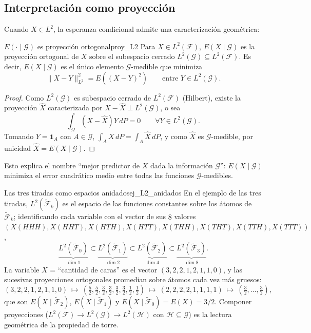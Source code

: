 \documentclass[11pt, a4paper]{article}
\begin{document}
\subsection{Interpretación como proyección}

Cuando $X \in L^2$, la esperanza condicional admite una caracterización geométrica:

\begin{teorema}{$E(\cdot \mid \mathcal{G})$ es proyección ortogonal}{proy_L2}
Para $X \in L^2(\mathcal{F})$, $E(X \mid \mathcal{G})$ es la proyección ortogonal de $X$ sobre el
subespacio cerrado $L^2(\mathcal{G}) \subseteq L^2(\mathcal{F})$. Es decir, $E(X \mid \mathcal{G})$
es el único elemento $\mathcal{G}$-medible que minimiza
$$ \|X - Y\|_{L^2}^2 = E((X - Y)^2) \qquad \text{entre } Y \in L^2(\mathcal{G}). $$
\end{teorema}

\begin{proof}
Como $L^2(\mathcal{G})$ es subespacio cerrado de $L^2(\mathcal{F})$ (Hilbert), existe la
proyección $\widehat{X}$ caracterizada por $X - \widehat{X} \perp L^2(\mathcal{G})$, o sea
$$ \int_\Omega (X - \widehat{X}) Y \, dP = 0 \qquad \forall Y \in L^2(\mathcal{G}). $$
Tomando $Y = \mathbf{1}_A$ con $A \in \mathcal{G}$, $\int_A X \, dP = \int_A \widehat{X} \, dP$, y
como $\widehat{X}$ es $\mathcal{G}$-medible, por unicidad $\widehat{X} = E(X \mid \mathcal{G})$.
\end{proof}

\obs Esto explica el nombre ``mejor predictor de $X$ dada la información $\mathcal{G}$'':
$E(X \mid \mathcal{G})$ minimiza el error cuadrático medio entre todas las funciones
$\mathcal{G}$-medibles.

\begin{ejemplo}{Las tres tiradas como espacios anidados}{ej_L2_anidados}
En el ejemplo de las tres tiradas, $L^2(\widetilde{\mathcal{F}}_k)$ es el espacio de las
funciones constantes sobre los átomos de $\widetilde{\mathcal{F}}_k$; identificando cada
variable con el vector de sus $8$ valores $(X(HHH), X(HHT), X(HTH), X(HTT), X(THH), X(THT),
X(TTH), X(TTT))$,
$$ \underbrace{L^2(\widetilde{\mathcal{F}}_0)}_{\dim 1} \subset
\underbrace{L^2(\widetilde{\mathcal{F}}_1)}_{\dim 2} \subset
\underbrace{L^2(\widetilde{\mathcal{F}}_2)}_{\dim 4} \subset
\underbrace{L^2(\widetilde{\mathcal{F}}_3)}_{\dim 8}. $$
La variable $X$ = ``cantidad de caras'' es el vector $(3, 2, 2, 1, 2, 1, 1, 0)$, y las
sucesivas proyecciones ortogonales promedian sobre átomos cada vez más gruesos:
$$ (3,2,2,1,2,1,1,0) \ \mapsto \ \left(\tfrac{5}{2}, \tfrac{5}{2}, \tfrac{3}{2}, \tfrac{3}{2},
\tfrac{3}{2}, \tfrac{3}{2}, \tfrac{1}{2}, \tfrac{1}{2}\right) \ \mapsto \ (2,2,2,2,1,1,1,1)
\ \mapsto \ \left(\tfrac{3}{2}, \dots, \tfrac{3}{2}\right), $$
que son $E(X \mid \widetilde{\mathcal{F}}_2)$, $E(X \mid \widetilde{\mathcal{F}}_1)$ y
$E(X \mid \widetilde{\mathcal{F}}_0) = E(X) = 3/2$. Componer proyecciones
($L^2(\mathcal{F}) \to L^2(\mathcal{G}) \to L^2(\mathcal{H})$ con $\mathcal{H} \subseteq
\mathcal{G}$) es la lectura geométrica de la propiedad de torre.
\end{ejemplo}
\end{document}
